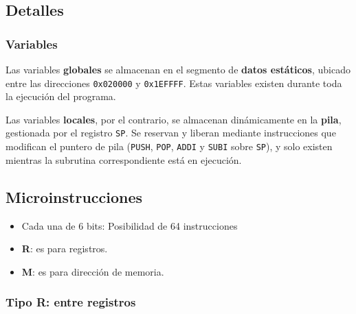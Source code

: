 \documentclass{article}
\begin{document}
\subsection{Detalles}

\subsubsection{Variables}

Las variables \textbf{globales} se almacenan en el segmento de \textbf{datos estáticos}, ubicado entre las direcciones \texttt{0x020000} y \texttt{0x1EFFFF}. Estas variables existen durante toda la ejecución del programa.

Las variables \textbf{locales}, por el contrario, se almacenan dinámicamente en la \textbf{pila}, gestionada por el registro \texttt{SP}. Se reservan y liberan mediante instrucciones que modifican el puntero de pila (\texttt{PUSH}, \texttt{POP}, \texttt{ADDI} y \texttt{SUBI} sobre \texttt{SP}), y solo existen mientras la subrutina correspondiente está en ejecución.

\subsection{Microinstrucciones}

\begin{itemize}
    \item Cada una de 6 bits: Posibilidad de 64 instrucciones
    \item \textbf{R}: es para registros.
    \item \textbf{M}: es para dirección de memoria.
\end{itemize}

\subsubsection{Tipo R: \textbf{entre registros}}
\end{document}
